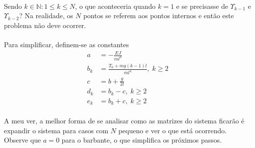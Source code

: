 \documentclass[a4paper,11pt]{scrartcl} %
\numberwithin{equation}{section} %
\numberwithin{figure}{section} %
\numberwithin{table}{section} %
\begin{document}
\paragraph{} Sendo $k\in \mathbb{N}:1\le k \le N$, o que aconteceria quando $k=1$ e se precisasse de $\Upsilon_{k-1}$ e $\Upsilon_{k-2}$? Na realidade, os $N$ pontos se referem aos pontos internos e então este problema não deve ocorrer.

\paragraph{} Para simplificar, definem-se as constantes \begin{align}
	a &= -\frac{EJ}{m l^4}\\
	b_k &= \frac{T_0 + mg(k-1)l}{m l^4},\; k\ge 2\\
	c &= b + \frac{g}{2l}\\
	d_k &= b_k - c,\; k\ge 2\\
	e_k &= b_k + c,\; k\ge 2
\end{align}

\paragraph{} A meu ver, a melhor forma de se analisar como as matrizes do sistema ficarão é expandir o sistema para casos com $N$ pequeno e ver o que está ocorrendo. Observe que $a=0$ para o barbante, o que simplifica os próximos passos.
\end{document}
